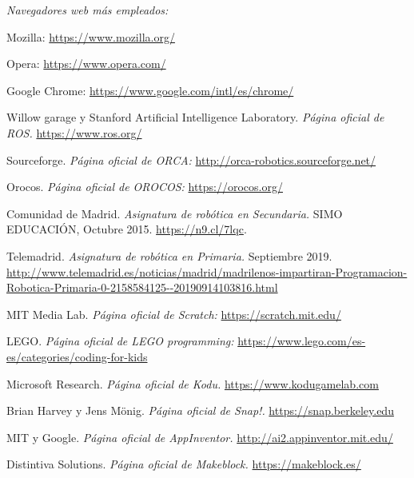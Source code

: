 \begin{thebibliography}{99}

    \textit{Navegadores web más empleados:}

    Mozilla: \url{https://www.mozilla.org/}
    
    Opera: \url{https://www.opera.com/}

    Google Chrome: \url{https://www.google.com/intl/es/chrome/}
    
    Willow garage y Stanford Artificial Intelligence Laboratory.
    \textit{Página oficial de ROS.}
    \url{https://www.ros.org/}
    
    Sourceforge.
    \textit{Página oficial de ORCA:}
    \url{http://orca-robotics.sourceforge.net/}
    
    Orocos.
    \textit{Página oficial de OROCOS:}
    \url{https://orocos.org/}
    
    Comunidad de Madrid. %
    \textit{Asignatura de robótica en Secundaria.} %
    SIMO EDUCACIÓN, Octubre 2015. %
    \url{https://n9.cl/7lqc}. %

    Telemadrid. 
    \textit{Asignatura de robótica en Primaria.}
    Septiembre 2019. 
    \url{http://www.telemadrid.es/noticias/madrid/madrilenos-impartiran-Programacion-Robotica-Primaria-0-2158584125--20190914103816.html}

    MIT Media Lab.
    \textit{Página oficial de Scratch:}
    \url{https://scratch.mit.edu/}
    
    LEGO.
    \textit{Página oficial de LEGO programming:}
    \url{https://www.lego.com/es-es/categories/coding-for-kids}
    
    Microsoft Research.
    \textit{Página oficial de Kodu.}
    \url{https://www.kodugamelab.com}
    
    Brian Harvey y Jens Mönig.
    \textit{Página oficial de Snap!.}
    \url{https://snap.berkeley.edu}
    
    MIT y Google.
    \textit{Página oficial de AppInventor.}
    \url{http://ai2.appinventor.mit.edu/}
    
    Distintiva Solutions.
    \textit{Página oficial de Makeblock.}
    \url{https://makeblock.es/}
    

\end{thebibliography}
